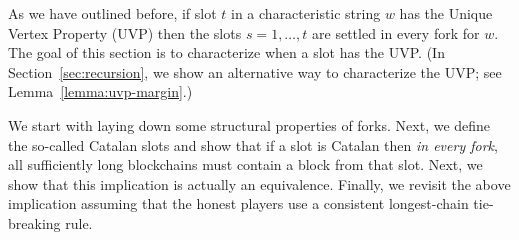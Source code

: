 As we have outlined before, 
if slot $t$ in a characteristic string $w$ 
has the Unique Vertex Property (UVP) 
then the slots $s = 1, \ldots, t$ 
are settled in every fork for $w$. 
The goal of this section is to 
characterize when a slot has the UVP. 
(In Section~\ref{sec:recursion}, we show an alternative way 
to characterize the UVP; see Lemma~\ref{lemma:uvp-margin}.) 

We start with laying down some structural properties of forks. 
Next, we define the so-called Catalan slots 
and show that if a slot is Catalan then \emph{in every fork}, all sufficiently long blockchains must contain a block from that slot. 
Next, we show that this implication is actually an equivalence. 
Finally, 
we revisit the above implication assuming 
that the honest players use a consistent longest-chain tie-breaking rule.





